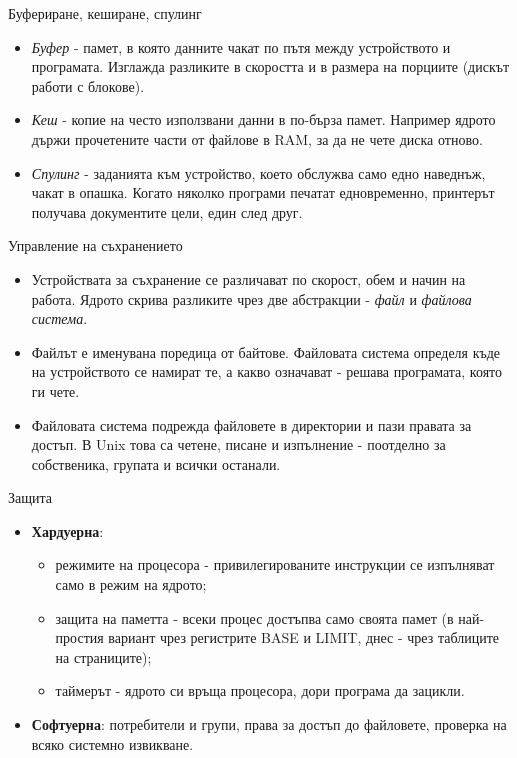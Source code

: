 \documentclass[14pt, aspectratio=169]{beamer}
\begin{document}
\begin{frame}{Буфериране, кеширане, спулинг}
  \begin{itemize}
    \item \emph{Буфер} - памет, в която данните чакат по пътя между
      устройството и програмата. Изглажда разликите в скоростта и в размера на
      порциите (дискът работи с блокове).
    \item \emph{Кеш} - копие на често използвани данни в по-бърза памет.
      Например ядрото държи прочетените части от файлове в RAM, за да не чете
      диска отново.
    \item \emph{Спулинг} - заданията към устройство, което обслужва само едно
      наведнъж, чакат в опашка. Когато няколко програми печатат едновременно,
      принтерът получава документите цели, един след друг.
  \end{itemize}
\end{frame}

\begin{frame}{Управление на съхранението}
  \begin{itemize}
    \item Устройствата за съхранение се различават по скорост, обем и начин на
      работа. Ядрото скрива разликите чрез две абстракции - \emph{файл} и
      \emph{файлова система}.
    \item Файлът е именувана поредица от байтове. Файловата система определя
      къде на устройството се намират те, а какво означават - решава
      програмата, която ги чете.
    \item Файловата система подрежда файловете в директории и пази правата за
      достъп. В Unix това са четене, писане и изпълнение - поотделно за
      собственика, групата и всички останали.
  \end{itemize}
\end{frame}

\begin{frame}{Защита}
  \begin{itemize}
    \item \textbf{Хардуерна}:
      \begin{itemize}
        \item режимите на процесора - привилегированите инструкции се
          изпълняват само в режим на ядрото;
        \item защита на паметта - всеки процес достъпва само своята памет (в
          най-простия вариант чрез регистрите BASE и LIMIT, днес - чрез
          таблиците на страниците);
        \item таймерът - ядрото си връща процесора, дори програма да зацикли.
      \end{itemize}
    \item \textbf{Софтуерна}: потребители и групи, права за достъп до
      файловете, проверка на всяко системно извикване.
  \end{itemize}
\end{frame}
\end{document}

